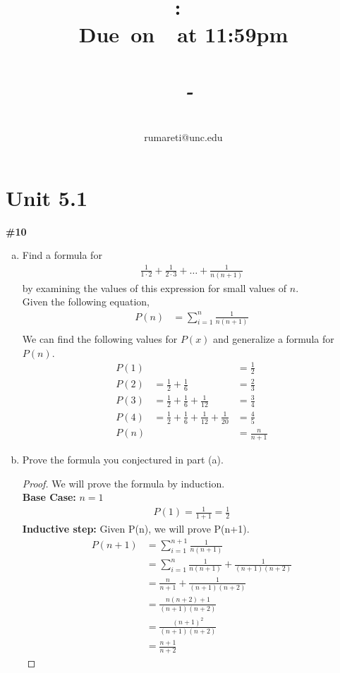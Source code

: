 \documentclass{article}
\title{
    \vspace{2in}
    \textmd{\textbf{\hmwkClass:\ \hmwkTitle}}\\
    \normalsize\vspace{0.1in}\small{\textbf{Due\ on\ \hmwkDueDate\ at 11:59pm}}\\
    \normalsize\text{Tuesday/Thursday 11:00-12:15, Phillips 383}\\
    \vspace{0.1in}\large{\textit{\hmwkClassInstructor\ - \hmwkClassTime}}
    \vspace{3in}
}
\author{\hmwkAuthorName\\\small{rumareti@unc.edu}}
\date{}
\newcommand{\unit}[1]{\section{Unit #1}}
\newcommand{\problem}[1]{\textbf{\##1}}
\newcommand{\prob}[1]{\problem{#1}}
\begin{document}
\maketitle

\pagebreak

\unit{5.1}
\prob{10}
\begin{enumerate}[a)]
    \item Find a formula for
    \begin{align*}
        \frac{1}{1\cdot2}+\frac{1}{2\cdot3}+\ldots+\frac{1}{n(n+1)}
    \end{align*}
    by examining the values of this expression for small values of \(n\).\\

Given the following equation,
\begin{align*}
    P(n) &= \sum_{i=1}^{n}\frac{1}{n(n+1)}\\
\end{align*}
We can find the following values for \(P(x)\) and generalize a formula for \(P(n)\).
\begin{align*}
    P(1) &&= \frac{1}{2}\\
    P(2) &= \frac{1}{2}+\frac{1}{6}&=\frac{2}{3}\\
    P(3) &= \frac{1}{2}+\frac{1}{6}+\frac{1}{12}&=\frac{3}{4}\\
    P(4) &= \frac{1}{2}+\frac{1}{6}+\frac{1}{12}+\frac{1}{20}&=\frac{4}{5}\\
    P(n) &&= \frac{n}{n+1}
\end{align*}
    \item Prove the formula you conjectured in part (a).
\begin{proof}
    We will prove the formula by induction.\\
    \textbf{Base Case:} \(n=1\)
    \begin{align*}
        P(1) = \frac{1}{1+1} = \frac{1}{2}
    \end{align*}
    \textbf{Inductive step:}
    Given P(n), we will prove P(n+1).
    \begin{align*}
        P(n+1) &= \sum_{i=1}^{n+1}\frac{1}{n(n+1)}\\
        &= \sum_{i=1}^{n}\frac{1}{n(n+1)}+\frac{1}{(n+1)(n+2)}\\
        &= \frac{n}{n+1}+\frac{1}{(n+1)(n+2)}\\
        &= \frac{n(n+2)+1}{(n+1)(n+2)}\\
        &= \frac{(n+1)^2}{(n+1)(n+2)}\\
        &= \frac{n+1}{n+2}
    \end{align*}
\end{proof}
\end{enumerate}
\end{document}
